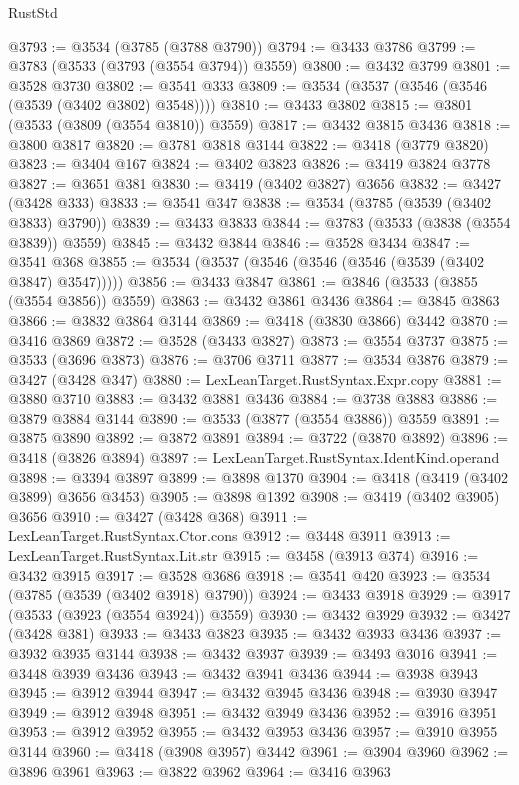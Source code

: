 \begin{lexlean}{RustStd}
\begin{coremodule}
@3793 := @3534 (@3785 (@3788 @3790))
@3794 := @3433 @3786
@3799 := @3783 (@3533 (@3793 (@3554 @3794)) @3559)
@3800 := @3432 @3799
@3801 := @3528 @3730
@3802 := @3541 @333
@3809 := @3534 (@3537 (@3546 (@3546 (@3539 (@3402 @3802) @3548))))
@3810 := @3433 @3802
@3815 := @3801 (@3533 (@3809 (@3554 @3810)) @3559)
@3817 := @3432 @3815 @3436
@3818 := @3800 @3817
@3820 := @3781 @3818 @3144
@3822 := @3418 (@3779 @3820)
@3823 := @3404 @167
@3824 := @3402 @3823
@3826 := @3419 @3824 @3778
@3827 := @3651 @381
@3830 := @3419 (@3402 @3827) @3656
@3832 := @3427 (@3428 @333)
@3833 := @3541 @347
@3838 := @3534 (@3785 (@3539 (@3402 @3833) @3790))
@3839 := @3433 @3833
@3844 := @3783 (@3533 (@3838 (@3554 @3839)) @3559)
@3845 := @3432 @3844
@3846 := @3528 @3434
@3847 := @3541 @368
@3855 := @3534 (@3537 (@3546 (@3546 (@3546 (@3539 (@3402 @3847) @3547)))))
@3856 := @3433 @3847
@3861 := @3846 (@3533 (@3855 (@3554 @3856)) @3559)
@3863 := @3432 @3861 @3436
@3864 := @3845 @3863
@3866 := @3832 @3864 @3144
@3869 := @3418 (@3830 @3866) @3442
@3870 := @3416 @3869
@3872 := @3528 (@3433 @3827)
@3873 := @3554 @3737
@3875 := @3533 (@3696 @3873)
@3876 := @3706 @3711
@3877 := @3534 @3876
@3879 := @3427 (@3428 @347)
@3880 := LexLeanTarget.RustSyntax.Expr.copy
@3881 := @3880 @3710
@3883 := @3432 @3881 @3436
@3884 := @3738 @3883
@3886 := @3879 @3884 @3144
@3890 := @3533 (@3877 (@3554 @3886)) @3559
@3891 := @3875 @3890
@3892 := @3872 @3891
@3894 := @3722 (@3870 @3892)
@3896 := @3418 (@3826 @3894)
@3897 := LexLeanTarget.RustSyntax.IdentKind.operand
@3898 := @3394 @3897
@3899 := @3898 @1370
@3904 := @3418 (@3419 (@3402 @3899) @3656 @3453)
@3905 := @3898 @1392
@3908 := @3419 (@3402 @3905) @3656
@3910 := @3427 (@3428 @368)
@3911 := LexLeanTarget.RustSyntax.Ctor.cons
@3912 := @3448 @3911
@3913 := LexLeanTarget.RustSyntax.Lit.str
@3915 := @3458 (@3913 @374)
@3916 := @3432 @3915
@3917 := @3528 @3686
@3918 := @3541 @420
@3923 := @3534 (@3785 (@3539 (@3402 @3918) @3790))
@3924 := @3433 @3918
@3929 := @3917 (@3533 (@3923 (@3554 @3924)) @3559)
@3930 := @3432 @3929
@3932 := @3427 (@3428 @381)
@3933 := @3433 @3823
@3935 := @3432 @3933 @3436
@3937 := @3932 @3935 @3144
@3938 := @3432 @3937
@3939 := @3493 @3016
@3941 := @3448 @3939 @3436
@3943 := @3432 @3941 @3436
@3944 := @3938 @3943
@3945 := @3912 @3944
@3947 := @3432 @3945 @3436
@3948 := @3930 @3947
@3949 := @3912 @3948
@3951 := @3432 @3949 @3436
@3952 := @3916 @3951
@3953 := @3912 @3952
@3955 := @3432 @3953 @3436
@3957 := @3910 @3955 @3144
@3960 := @3418 (@3908 @3957) @3442
@3961 := @3904 @3960
@3962 := @3896 @3961
@3963 := @3822 @3962
@3964 := @3416 @3963

\end{coremodule}
\end{lexlean}
